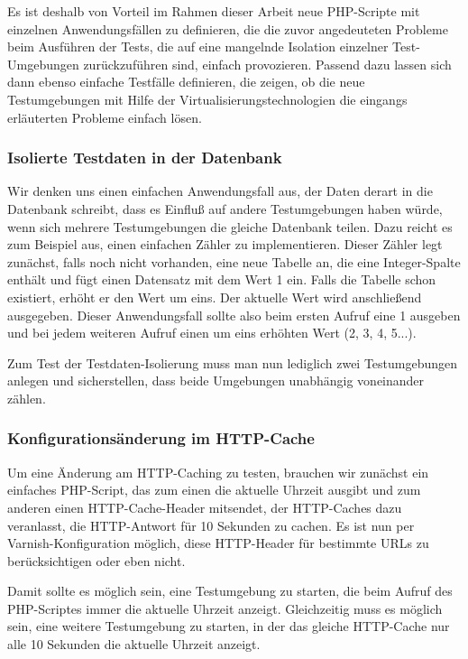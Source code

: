 Es ist deshalb von Vorteil im Rahmen dieser Arbeit neue PHP-Scripte mit einzelnen Anwendungsfällen zu definieren, die die zuvor angedeuteten Probleme beim Ausführen der Tests, die auf eine mangelnde Isolation einzelner Test-Umgebungen zurückzuführen sind, einfach provozieren. Passend dazu lassen sich dann ebenso einfache Testfälle definieren, die zeigen, ob die neue Testumgebungen mit Hilfe der Virtualisierungstechnologien die eingangs erläuterten Probleme einfach lösen.

\subsubsection{Isolierte Testdaten in der Datenbank}

Wir denken uns einen einfachen Anwendungsfall aus, der Daten derart in die Datenbank schreibt, dass es Einfluß auf andere Testumgebungen haben würde, wenn sich mehrere Testumgebungen die gleiche Datenbank teilen. Dazu reicht es zum Beispiel aus, einen einfachen Zähler zu implementieren. Dieser Zähler legt zunächst, falls noch nicht vorhanden, eine neue Tabelle an, die eine Integer-Spalte enthält und fügt einen Datensatz mit dem Wert 1 ein. Falls die Tabelle schon existiert, erhöht er den Wert um eins. Der aktuelle Wert wird anschließend ausgegeben. Dieser Anwendungsfall sollte also beim ersten Aufruf eine 1 ausgeben und bei jedem weiteren Aufruf einen um eins erhöhten Wert (2, 3, 4, 5...).

Zum Test der Testdaten-Isolierung muss man nun lediglich zwei Testumgebungen anlegen und sicherstellen, dass beide Umgebungen unabhängig voneinander zählen.

\subsubsection{Konfigurationsänderung im HTTP-Cache}

Um eine Änderung am HTTP-Caching zu testen, brauchen wir zunächst ein einfaches PHP-Script, das zum einen die aktuelle Uhrzeit ausgibt und zum anderen einen HTTP-Cache-Header mitsendet, der HTTP-Caches dazu veranlasst, die HTTP-Antwort für 10 Sekunden zu cachen.
Es ist nun per Varnish-Konfiguration möglich, diese HTTP-Header für bestimmte URLs zu berücksichtigen oder eben nicht.

Damit sollte es möglich sein, eine Testumgebung zu starten, die beim Aufruf des PHP-Scriptes immer die aktuelle Uhrzeit anzeigt. Gleichzeitig muss es möglich sein, eine weitere Testumgebung zu starten, in der das gleiche HTTP-Cache nur alle 10 Sekunden die aktuelle Uhrzeit anzeigt.

